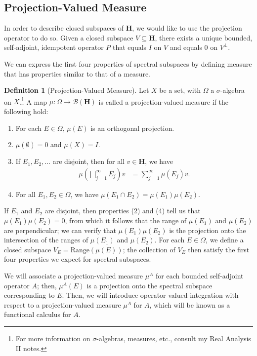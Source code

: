 \documentclass[10pt]{extarticle}
\theoremstyle{plain}
\theoremstyle{definition}
\newtheorem*{definition}{Definition}
\theoremstyle{remark}
\renewcommand{\newline}{\hfill\break}
\begin{document}
  \subsection{Projection-Valued Measure}%
  In order to describe closed subspaces of $\mathbf{H}$, we would like to use the projection operator to do so. Given a closed subspace $V\subseteq \mathbf{H}$, there exists a unique bounded, self-adjoint, idempotent operator $P$ that equals $I$ on $V$ and equals $0$ on $V^{\perp}$.\newline

  We can express the first four properties of spectral subspaces by defining measure that has properties similar to that of a measure.
  \begin{definition}[Projection-Valued Measure]
    Let $X$ be a set, with $\Omega$ a $\sigma$-algebra on $X$.\footnote{For more information on $\sigma$-algebras, measures, etc., consult my Real Analysis II notes.} A map $\mu: \Omega \rightarrow \mathcal{B}\left(\mathbf{H}\right)$ is called a projection-valued measure if the following hold:
        \begin{enumerate}[(1)]
          \item For each $E\in \Omega$, $\mu(E)$ is an orthogonal projection.
          \item $\mu(\emptyset) = 0$ and $\mu(X) = I$.
          \item If $E_1,E_2,\dots$ are disjoint, then for all $v\in \mathbf{H}$, we have
            \begin{align*}
              \mu\left(\bigsqcup_{j=1}^{\infty}E_j\right)v &= \sum_{j=1}^{\infty}\mu(E_j)v.
            \end{align*}
          \item For all $E_1,E_2\in \Omega$, we have $\mu(E_1\cap E_2) = \mu(E_1)\mu(E_2)$.
        \end{enumerate}
  \end{definition}
  If $E_1$ and $E_2$ are disjoint, then properties (2) and (4) tell us that $\mu(E_1)\mu(E_2) = 0$, from which it follows that the range of $\mu(E_1)$ and $\mu(E_2)$ are perpendicular; we can verify that $\mu(E_1)\mu(E_2)$ is the projection onto the intersection of the ranges of $\mu(E_1)$ and $\mu(E_2)$. For each $E\in \Omega$, we define a closed subspace $V_E = \text{Range}(\mu(E))$; the collection of $V_E$ then satisfy the first four properties we expect for spectral subspaces.\newline

  We will associate a projection-valued measure $\mu^{A}$ for each bounded self-adjoint operator $A$; then, $\mu^{A}(E)$ is a projection onto the spectral subspace corresponding to $E$. Then, we will introduce operator-valued integration with respect to a projection-valued measure $\mu^{A}$ for $A$, which will be known as a functional calculus for $A$.\newline
\end{document}

